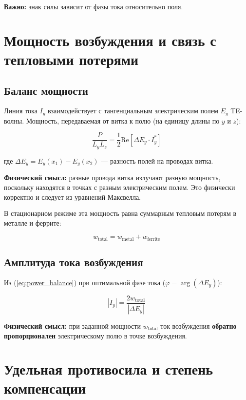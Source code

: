 \documentclass[a4paper,12pt]{article}
\begin{document}
\textbf{Важно:} знак силы зависит от фазы тока относительно поля.

\section{Мощность возбуждения и связь с тепловыми потерями}

\subsection{Баланс мощности}

Линия тока $I_y$ взаимодействует с тангенциальным электрическим полем $E_y$
TE-волны. Мощность, передаваемая от витка к полю (на единицу длины по $y$ и $z$):

\begin{equation}
\frac{P}{L_y L_z} = \frac{1}{2} \text{Re} \left[ \Delta E_y \cdot I_y^* \right]
\label{eq:power_balance}
\end{equation}

где $\Delta E_y = E_y(x_1) - E_y(x_2)$ --- разность полей на проводах витка.

\textbf{Физический смысл:} разные провода витка излучают разную мощность,
поскольку находятся в точках с разным электрическим полем. Это физически
корректно и следует из уравнений Максвелла.

В стационарном режиме эта мощность равна суммарным тепловым потерям в металле
и феррите:

\begin{equation}
w_{\text{total}} = w_{\text{metal}} + w_{\text{ferrite}}
\label{eq:power_losses}
\end{equation}

\subsection{Амплитуда тока возбуждения}

Из (\ref{eq:power_balance}) при оптимальной фазе тока
($\varphi = \arg(\Delta E_y)$):

\begin{equation}
\boxed{
|I_y| = \frac{2 w_{\text{total}}}{|\Delta E_y|}
}
\label{eq:current_amplitude}
\end{equation}

\textbf{Физический смысл:} при заданной мощности $w_{\text{total}}$ ток
возбуждения \textbf{обратно пропорционален} электрическому полю в точке
возбуждения.

\section{Удельная противосила и степень компенсации}
\end{document}
